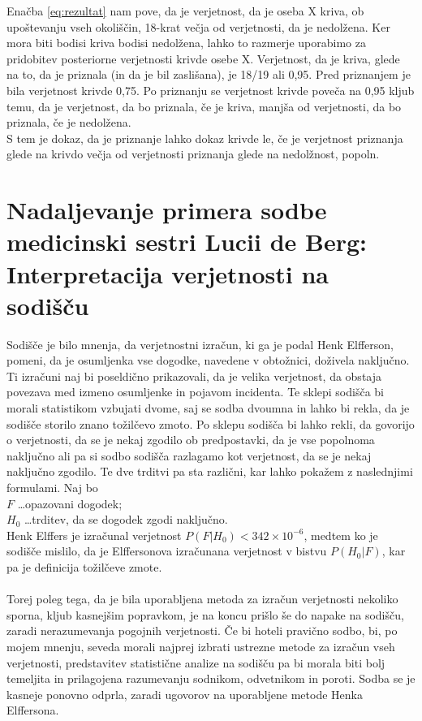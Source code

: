 \documentclass[12pt,a4paper]{amsart}
\theoremstyle{definition} %
\theoremstyle{plain} %
\begin{document}
Enačba \eqref{eq:rezultat} nam pove, da je verjetnost, da je oseba X kriva, ob upoštevanju vseh okoliščin, 18-krat večja od verjetnosti, da je nedolžena. Ker mora biti 
bodisi kriva bodisi nedolžena, lahko to razmerje uporabimo za pridobitev posteriorne verjetnosti krivde osebe X. Verjetnost, da je kriva, glede na to, 
da je priznala (in da je bil zaslišana), je 18/19 ali 0,95. Pred priznanjem je bila verjetnost krivde 0,75. Po priznanju se verjetnost krivde poveča 
na 0,95 kljub temu, da je verjetnost, da bo priznala, če je kriva, manjša od verjetnosti, da bo priznala, če je nedolžena. \\
S tem je dokaz, da je priznanje lahko dokaz krivde le, če je verjetnost priznanja glede na krivdo večja od verjetnosti priznanja glede na nedolžnost, popoln.

\section{Nadaljevanje primera sodbe medicinski sestri Lucii de Berg: Interpretacija verjetnosti na sodišču}
Sodišče je bilo mnenja, da verjetnostni izračun, ki ga je podal Henk Elfferson, pomeni, da je osumljenka vse dogodke, navedene v obtožnici, doživela naključno. Ti 
izračuni naj bi poseldično prikazovali, da je velika verjetnost, da obstaja povezava med izmeno osumljenke in pojavom incidenta. Te sklepi sodišča bi morali statistikom 
vzbujati dvome, saj se sodba dvoumna in lahko bi rekla, da je sodišče storilo znano tožilčevo zmoto. Po sklepu sodišča bi lahko rekli, da govorijo o verjetnosti, da se je nekaj zgodilo 
ob predpostavki, da je vse popolnoma naključno ali pa si sodbo sodišča razlagamo kot verjetnost, da se je nekaj naključno zgodilo. Te dve trditvi pa sta različni, kar lahko 
pokažem z naslednjimi formulami. Naj bo\\
$F$ \dots opazovani dogodek;\\
$H_0$ \dots trditev, da se dogodek zgodi naključno.\\
Henk Elffers je izračunal verjetnost $P(F \lvert H_0) < 342 \times 10^{-6}$, medtem ko je sodišče mislilo, da je Elffersonova izračunana verjetnost v bistvu $P(H_0 \lvert F)$, 
kar pa je definicija tožilčeve zmote.\\\\
Torej poleg tega, da je bila uporabljena metoda za izračun verjetnosti nekoliko sporna, kljub kasnejšim popravkom, je na koncu prišlo še do napake na sodišču, zaradi 
nerazumevanja pogojnih verjetnosti. Če bi hoteli pravično sodbo, bi, po mojem mnenju, seveda morali najprej izbrati ustrezne metode za izračun vseh verjetnosti, predstavitev 
statistične analize na sodišču pa bi morala biti bolj temeljita in prilagojena razumevanju sodnikom, odvetnikom in poroti. Sodba se je kasneje ponovno odprla, 
zaradi ugovorov na uporabljene metode Henka Elffersona.
\end{document}
